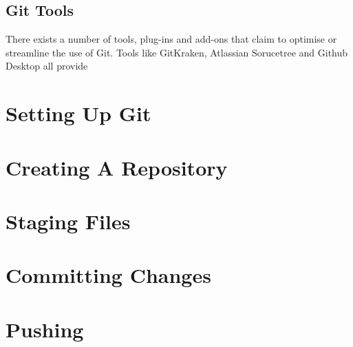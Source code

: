 \documentclass[11pt, a4paper, draft, titlepage]{article}
\begin{document}
\subsection{Git Tools} There exists a number of tools, plug-ins and add-ons
that claim to optimise or streamline the use of Git.  Tools like GitKraken,
Atlassian Sorucetree and Github Desktop all provide 

\section{Setting Up Git}

\section{Creating A Repository}

\section{Staging Files}

\section{Committing Changes}

\section{Pushing}
\end{document}
